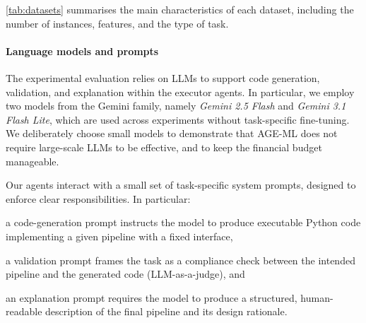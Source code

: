 \documentclass[runningheads]{llncs}
\newenvironment{inlinelist}{\begin{enumerate*}[label=\emph{(\roman*)}]}{\end{enumerate*}}
\newcommand{\ourapproach}[0]{\textsc{AGE-ML}}
\begin{document}
%
%
%
%
\cref{tab:datasets} summarises the main characteristics of each dataset, including the number of instances, features, and the type of task.

\paragraph{Language models and prompts}
%
The experimental evaluation relies on \acp{LLM} to support code generation, validation, and explanation within the executor agents.
%
In particular,
we employ two models from the Gemini family,
namely \textit{Gemini 2.5 Flash} and \textit{Gemini 3.1 Flash Lite},
which are used across experiments without task-specific fine-tuning.
%
We deliberately choose small models to demonstrate that \ourapproach{} does not require large-scale \acp{LLM} to be effective,
and to keep the financial budget manageable.

Our agents interact with a small set of task-specific system prompts,
designed to enforce clear responsibilities.
%
In particular:
\begin{inlinelist}
  \item a code-generation prompt instructs the model to produce executable Python code implementing a given pipeline with a fixed interface,
  \item a validation prompt frames the task as a compliance check between the intended pipeline and the generated code (LLM-as-a-judge), and
  \item an explanation prompt requires the model to produce a structured,
human-readable description of the final pipeline and its design rationale.
\end{inlinelist}
\end{document}
